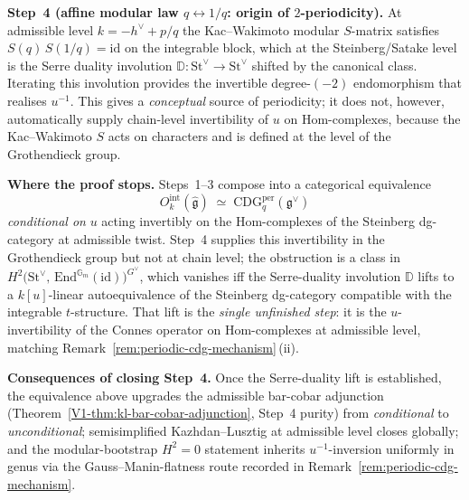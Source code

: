 \begin{remark}
\medskip
\noindent\textbf{Step~4 (affine modular law $q \leftrightarrow 1/q$:
origin of $2$-periodicity).}
At admissible level $k = -h^\vee + p/q$ the Kac--Wakimoto modular
$S$-matrix satisfies
$S(q) \,S(1/q) = \mathrm{id}$ on the integrable block, which at the
Steinberg/Satake level is the Serre duality involution
$\mathbb{D} : \mathrm{St}^\vee \to \mathrm{St}^\vee$
shifted by the canonical class. Iterating this involution provides the
invertible degree-$(-2)$ endomorphism that realises
$u^{-1}$. This gives a \emph{conceptual} source of periodicity; it
does not, however, automatically supply chain-level invertibility of
$u$ on $\mathrm{Hom}$-complexes, because the Kac--Wakimoto $S$ acts on
characters and is defined at the level of the Grothendieck group.

\medskip
\noindent\textbf{Where the proof stops.}
Steps~1--3 compose into a categorical equivalence
\[
O^{\mathrm{int}}_k(\widehat{\mathfrak{g}})
\;\simeq\;
\mathrm{CDG}_q^{\mathrm{per}}(\mathfrak{g}^\vee)
\]
\emph{conditional on} $u$ acting invertibly on the
$\mathrm{Hom}$-complexes of the Steinberg dg-category at admissible
twist. Step~4 supplies this invertibility in the Grothendieck group
but not at chain level; the obstruction is a class in
$H^2\bigl(\mathrm{St}^\vee,\,
\mathrm{End}^{\mathbb{G}_m}\!(\mathrm{id})\bigr)^{G^\vee}$, which
vanishes iff the Serre-duality involution $\mathbb{D}$ lifts to a
$k[u]$-linear autoequivalence of the Steinberg dg-category
compatible with the integrable $t$-structure. That lift is the
\emph{single unfinished step}: it is the $u$-invertibility of the
Connes operator on Hom-complexes at admissible level, matching
Remark~\textup{\ref{rem:periodic-cdg-mechanism}}\,(ii).

\medskip
\noindent\textbf{Consequences of closing Step~4.} Once the
Serre-duality lift is established, the equivalence above upgrades the
admissible bar-cobar adjunction
(Theorem~\ref{V1-thm:kl-bar-cobar-adjunction}, Step~4 purity) from
\emph{conditional} to \emph{unconditional}; semisimplified
Kazhdan--Lusztig at admissible level closes globally; and the
modular-bootstrap $H^2 = 0$ statement inherits $u^{-1}$-inversion
uniformly in genus via the Gauss--Manin-flatness route recorded in
Remark~\textup{\ref{rem:periodic-cdg-mechanism}}.
\end{remark}

